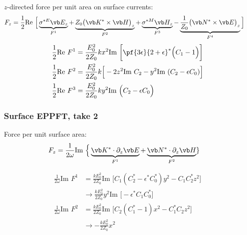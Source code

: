 $z$-directed force per unit area on surface currents:
\begin{align*}
  F_z &=
\frac{1}{2}\text{Re }\Big[
    \underbrace{\sigma^{*E} \vb E_z}_{F^1} 
 +  \underbrace{Z_0 \big(\vb K^* \times \vb H\big)_z}_{F^2}
 +  \underbrace{\sigma^{*M} \vb H_z}_{F^3} 
 -  \underbrace{ \frac{1}{Z_0} \big(\vb N^* \times \vb E\big)_z}_{F^4}
 \Big]
\end{align*}
\begin{align*}
 \frac{1}{2}\text{Re } F^1 
&= \frac{E_0^2}{2Z_0} k x^2
   \text{Im }
   \bigg[ \pf{3\epsilon}{2+\epsilon}^* \Big( C_1-1 \Big)\bigg]
\\
 \frac{1}{2}\text{Re } F^2 
&= \frac{E_0^2}{2Z_0} k \Big[ -2 z^2\text{Im }C_2
                              -  y^2\text{Im }(C_2 - \epsilon C_0)
                        \Big]
\\
 \frac{1}{2}\text{Re } F^3
&= \frac{E_0^2}{2Z_0} k y^2
   \text{Im }
   \Big( C_2 - \epsilon C_0\Big)
\\
\end{align*}

\subsubsection*{Surface EPPFT, take 2}

Force per unit surface area: 
\begin{align*}
 F_z &= \frac{1}{2\omega}\text{Im }
 \Big\{ \underbrace{\vb K^* \cdot \partial_z \vb E}
                  _{F^1}
       +\underbrace{\vb N^* \cdot \partial_z \vb H}
                  _{F^2}
     \}
\end{align*}

\begin{align*}
\frac{1}{2\omega}\text{Im } F^1
&=\frac{k E_0^2}{2Z_0} 
  \text{Im }\Big[  C_1(C_2^*-\epsilon^* C_0^*) y^2 - C_1 C_2^* z^2 \Big]
\\
&\to \frac{k E_0^2}{2Z_0} y^2 
     \text{Im }\Big[ -\epsilon^* C_1 C_0^*\Big]
\\
\frac{1}{2\omega}\text{Im } F^2
&=\frac{k E_0^2}{2Z_0} \text{Im }
   \Big[ C_2(C_1^* - 1)x^2 - C_1^* C_2 z^2 \Big]
\\
&\to -\frac{k E_0^2}{2Z_0} x^2
\end{align*}
